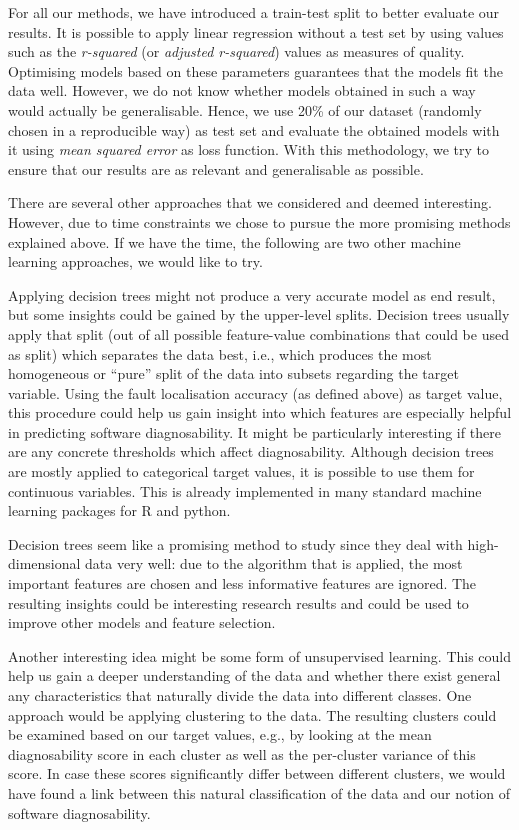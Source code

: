 \documentclass{scrartcl}
\begin{document}
For all our methods, we have introduced a train-test split to better evaluate
our results. It is possible to apply linear regression without a
test set by using values such as the \emph{r-squared} (or \emph{adjusted
r-squared}) values as measures of quality. Optimising models based on these
parameters guarantees that the models fit the data well. However, we do not know
whether models obtained in such a way would actually be generalisable. Hence, we
use 20\% of our dataset (randomly chosen in a reproducible way) as test set and
evaluate the obtained models with it using \emph{mean squared error} as loss
function. With this methodology, we try to ensure that our results are as
relevant and generalisable as possible.

There are several other approaches that we considered and deemed interesting.
However, due to time constraints we chose to pursue the more promising methods
explained above. If we have the time, the following are two other machine
learning approaches, we would like to try.

Applying decision trees might not produce a very accurate model as end result,
but some insights could be gained by the upper-level splits. Decision
trees usually apply that split (out of all possible feature-value combinations
that could be used as split) which separates the data best, i.e., which produces
the most homogeneous or \enquote{pure} split of the data into subsets regarding
the target variable. Using the fault localisation accuracy (as defined above) as
target value, this procedure could help us gain insight into which features are
especially helpful in predicting software diagnosability. It might be
particularly interesting if there are any concrete thresholds which affect
diagnosability. Although decision trees are mostly applied to categorical target
values, it is possible to use them for continuous variables. This is already
implemented in many standard machine learning packages for R and python.

Decision trees seem like a promising method to study since they deal with
high-dimensional data very well: due to the algorithm that is applied, the most
important features are chosen and less informative features are ignored. The
resulting insights could be interesting research results and could be used to
improve other models and feature selection.

Another interesting idea might be some form of unsupervised learning. This could
help us gain a deeper understanding of the data and whether there exist general
any characteristics that naturally divide the data into different classes. One
approach would be applying clustering to the data. The resulting clusters could
be examined based on our target values, e.g., by looking at the mean
diagnosability score in each cluster as well as the per-cluster variance of this
score. In case these scores significantly differ between different clusters, we
would have found a link between this natural classification of the data and our
notion of software diagnosability.
\end{document}
